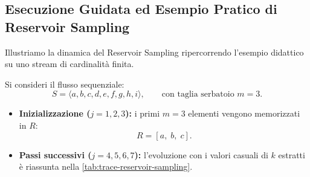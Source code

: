 \FloatBarrier
\subsection{Esecuzione Guidata ed Esempio Pratico di Reservoir Sampling}
Illustriamo la dinamica del Reservoir Sampling ripercorrendo l'esempio didattico su uno stream di cardinalità finita.

\begin{example}
Si consideri il flusso sequenziale:
\begin{equation}
  S = \langle a, b, c, d, e, f, g, h, i \rangle, \qquad \text{con taglia serbatoio } m = 3.
\end{equation}
\begin{itemize}
  \item \textbf{Inizializzazione ($j = 1, 2, 3$):} i primi $m = 3$ elementi vengono memorizzati in $R$:
  \begin{equation}
    R = [a, \; b, \; c].
  \end{equation}
  \item \textbf{Passi successivi ($j = 4, 5, 6, 7$):} l'evoluzione con i valori casuali di $k$ estratti è riassunta nella \autoref{tab:trace-reservoir-sampling}.
\end{itemize}

\begin{table}[H]
  \centering
  \caption{Traccia dell'esecuzione del Reservoir Sampling ($m = 3$).}
  \label{tab:trace-reservoir-sampling}
\end{table}
\end{example}

